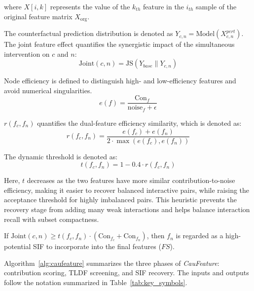 \documentclass[journal]{IEEEtran}
\begin{document}
where $X[i,k]$ represents the value of the $k_{th}$ feature in the $i_{th}$ sample of the original feature matrix $X_{\text{org}}$. 

The counterfactual prediction distribution is denoted as $Y_{c,n} = \text{Model}(X^{pert}_{c,n})$. The joint feature effect quantifies the synergistic impact of the simultaneous intervention on $c$ and $n$: 
\begin{equation}
    \text{Joint}(c,n) = \text{JS}(Y_{base} \parallel Y_{c,n})
\end{equation}

Node efficiency is defined to distinguish high- and low-efficiency features and avoid numerical singularities.
\begin{equation}
    e(f) = \frac{\text{Con}_f}{\text{noise}_f + \epsilon}
\end{equation}

$r(f_c,f_n)$ quantifies the dual-feature efficiency similarity, which is denoted as:
\begin{equation}
    r(f_c,f_n) = \frac{e(f_c) + e(f_n)}{2 \cdot \max(e(f_c),e(f_n))}
\end{equation}

The dynamic threshold is denoted as:
\begin{equation}
    t(f_c,f_n) = 1 - 0.4 \cdot r(f_c,f_n)
\end{equation}

Here, $t$ decreases as the two features have more similar contribution-to-noise efficiency, making it easier to recover balanced interactive pairs, while raising the acceptance threshold for highly imbalanced pairs. This heuristic prevents the recovery stage from adding many weak interactions and helps balance interaction recall with subset compactness.


If $\text{Joint}(c,n)\geq t(f_c,f_n)\cdot(  \text{Con}_{f_c}+\text{Con}_{f_n})$, then $f_n$ is regarded as a high-potential SIF to incorporate into the final features ($FS$).

Algorithm~\ref{alg:caufeature} summarizes the three phases of \textit{CauFeature}: contribution scoring, TLDF screening, and SIF recovery. The inputs and outputs follow the notation summarized in Table~\ref{tab:key_symbols}.
\end{document}
